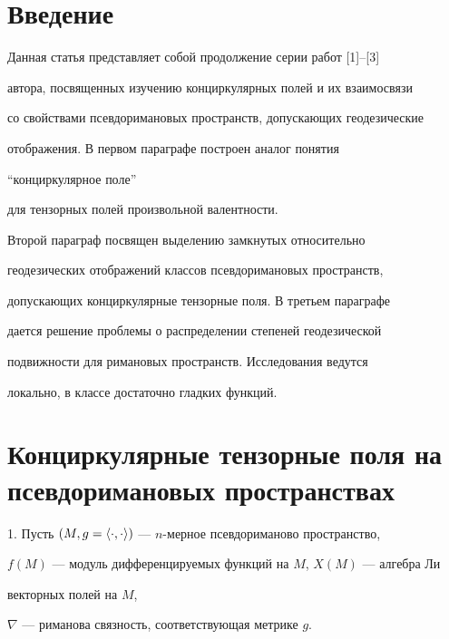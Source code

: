 \label{begin}





\section*{Введение}





Данная статья представляет собой продолжение серии работ [1]--[3] 


автора, посвященных изучению конциркулярных полей и их взаимосвязи 


со свойствами псевдоримановых пространств, допускающих геодезические 


отображения. В первом параграфе построен аналог понятия


``конциркулярное поле''


для тензорных полей произвольной валентности.


Второй параграф посвящен выделению замкнутых относительно 


геодезических отображений классов псевдоримановых пространств, 


допускающих конциркулярные тензорные поля. В третьем параграфе 


дается решение проблемы о распределении степеней геодезической 


подвижности для римановых пространств. Исследования ведутся 


локально, в классе достаточно гладких функций.





\section{Конциркулярные тензорные поля на псевдоримановых пространствах}





1. Пусть $(M,g=\langle\cdot,\cdot\rangle)$ --- $n$-мерное псевдориманово пространство,


$f(M)$ --- модуль дифференцируемых функций на $M$, $X(M)$ --- алгебра Ли


векторных полей на $M$,


$\nabla$ --- риманова связность, соответствующая метрике $g$. 





